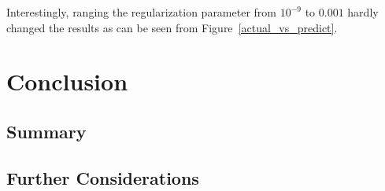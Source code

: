 \documentclass{article} %
\begin{document}
Interestingly, ranging the regularization parameter from $10^{-9}$ to $0.001$ hardly changed the results as can be seen from Figure~\ref{actual_vs_predict}.


\section{Conclusion}
\subsection{Summary}
\subsection{Further Considerations}






\end{document}
